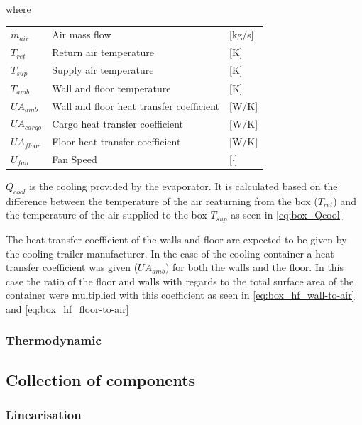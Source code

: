 where
\begin{center}
	\begin{tabular}{l p{8cm} l}
		$\dot{m}_{air}$			& Air mass flow 									& [\si{kg}/{\si{s}}] \\		
			$T_{ret}$			& Return air temperature 							& [\si{K}] \\		
			$T_{sup}$			& Supply air temperature							& [\si{K}] \\		
			$T_{amb}$			& Wall and floor temperature 						& [\si{K}] \\		
			$U A_{amb}$			& Wall and floor heat transfer coefficient 			& [\si{W}/\si{K}] \\		
			$U A_{cargo}$		& Cargo heat transfer coefficient 					& [\si{W}/\si{K}] \\		
			$U A_{floor}$		& Floor heat transfer coefficient 					& [\si{W}/\si{K}] \\		
			$U_{fan}$			& Fan Speed 										& [$\cdot$]
	\end{tabular}
\end{center}
	
	$Q_{cool}$ is the cooling provided by the evaporator. It is calculated based on the difference between the temperature of the air reaturning from the box ($T_{ret}$) and the temperature of the air supplied to the box $T_{sup}$ as seen in \cref{eq:box_Qcool}
	
	The heat transfer coefficient of the walls and floor are expected to be given by the cooling trailer manufacturer. In the case of the cooling container a heat transfer coefficient was given ($U A_{amb}$) for both the walls and the floor. In this case the ratio of the floor and walls with regards to the total surface area of the container were multiplied with this coefficient as seen in \cref{eq:box_hf_wall-to-air} and \cref{eq:box_hf_floor-to-air}





\subsubsection{Thermodynamic}

\subsection{Collection of components}

\subsubsection{Linearisation}